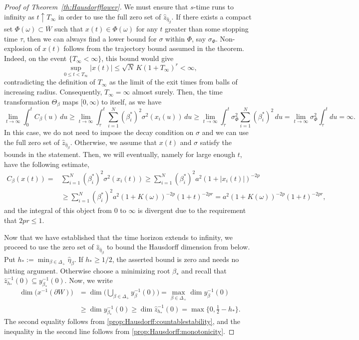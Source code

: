 \documentclass{article}
\numberwithin{equation}{section}
\newcommand{\C}{W}
\newcommand{\Cc}{\overline{W}}
\newcommand{\Cb}{\partial \C}
\newcommand{\Sni}{\sum_{i=1}^N}
\newcommand{\SimplePlus}{\Delta_+}
\theoremstyle{plain}
\begin{document}
\begin{proof}[Proof of Theorem~\ref{th:Hausdorfflower}]
        We must ensure that $s$-time runs to infinity as $t\uparrow T_\infty$ in order to use the full zero set of $\hat z_{\hat{\eta}_\beta}$. If there exists a compact set $\Phi(\omega)\subset\Cc$ such that $x(t)\in\Phi(\omega)$ for any $t$ greater than some stopping time $\tau$, then we can always find a lower bound for $\sigma$ within $\Phi$, say $\sigma_\Phi$. Non-explosion of $x(t)$ follows from the trajectory bound assumed in the theorem. Indeed, on the event $\{T_\infty<\infty\}$, this bound would give
            \begin{equation*}
                \sup_{0\leq t<T_\infty}|x(t)| \leq \sqrt{N}\,K(1+T_\infty)^r<\infty,
            \end{equation*}
        contradicting the definition of $T_\infty$ as the limit of the exit times from balls of increasing radius. Consequently, $T_\infty=\infty$ almost surely. Then, the time transformation $\Theta_\beta$ maps $[0,\infty)$ to itself, as we have
        \[\lim_{t\to\infty}\int_0^tC_\beta(u)\, du\geq\lim_{t\to\infty}\int_\tau^t\Sni(\beta_i^*)^2\sigma^2(x_i(u))\, du\geq \lim_{t\to\infty}\int_\tau^t\sigma^2_\Phi\Sni(\beta_i^*)^2\, du=\lim_{t\to\infty}\sigma^2_\Phi\int_\tau^t du=\infty.\]
        In this case, we do not need to impose the decay condition on $\sigma$ and we can use the full zero set of $\hat z_{\hat \eta_\beta}$. Otherwise, we assume that $x(t)$ and $\sigma$ satisfy the bounds in the statement. Then, we will eventually, namely for large enough $t$, have the following estimate,
        \begin{align*}
            C_\beta(x(t))=&\Sni(\beta_i^*)^2\sigma^2(x_i(t))\geq \Sni(\beta_i^*)^2a^2(1+|x_i(t)|)^{-2p}\\
            &\geq \Sni(\beta_i^*)^2a^2(1+K(\omega))^{-2p}(1+t)^{-2pr}=a^2(1+K(\omega))^{-2p}(1+t)^{-2pr},
        \end{align*}
        and the integral of this object from $0$ to $\infty$ is divergent due to the requirement that $2pr\leq1$.
        
        Now that we have established that the time horizon extends to infinity, we proceed to use the zero set of $\hat z_{\hat{\eta}_\beta}$ to bound the Hausdorff dimension from below. Put $h_*:=\min_{\beta\in\Delta_+}\hat\eta_\beta$. If $h_*\geq1/2$, the asserted bound is zero and needs no hitting argument. Otherwise choose a minimizing root $\beta_*$ and recall that $\hat z_{h_*}^{-1}(0)\subseteq y_{\beta_*}^{-1}(0)$. Now, we write
        \begin{align*}
            \dim\Big(x^{-1}(\Cb)\Big)&=\dim\Big(\bigcup_{\beta\in\SimplePlus}y_\beta^{-1}(0)\Big)=\max_{\beta\in\SimplePlus}\dim y_\beta^{-1}(0)\\
            &\geq\dim y_{\beta_*}^{-1}(0)\geq\dim \hat z_{h_*}^{-1}(0)=\max\Big\{0,\frac12-h_*\Big\}.
        \end{align*}
        The second equality follows from \ref{prop:Hausdorff:countablestability}, and the inequality in the second line follows from \ref{prop:Hausdorff:monotonicity}. 
        \end{proof}
\end{document}
